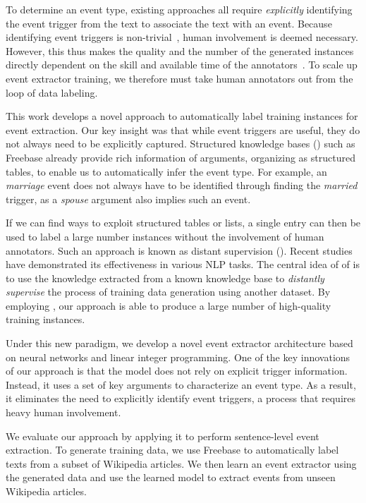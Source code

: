 To determine an event type, existing approaches  all require \emph{explicitly} identifying the event trigger from the text to associate the
text with an event. Because identifying event triggers is non-trivial~\FIXME{\cite{}}, human involvement is deemed necessary. However, this
thus makes the quality and the number of the generated instances directly dependent on the skill and available time of the
annotators~\cite{aguilar2014comparison,song2015light}. To scale up event extractor training, we therefore must take human annotators out
from the loop of data labeling.


This work develops a novel approach to automatically label training instances for event extraction. Our key insight was that while event
triggers are useful, they do not always need to be explicitly captured. Structured knowledge bases (\KBs) such as Freebase already provide
rich information of arguments, organizing as structured tables, to enable us to automatically infer the event type. For example, an
\emph{marriage} event does not always have to be identified through finding the \emph{married} trigger, as a \emph{spouse} argument also
implies
such an event. %


If we can find ways to exploit structured tables or lists, a single entry can then be used to label a large number instances without the
involvement of human annotators. Such an approach is known as distant supervision (\DS). Recent
studies~\cite{mintz2009distant,zeng2015distant} have demonstrated its effectiveness in various NLP tasks. The central idea of of \DS is to
use the knowledge extracted from a known knowledge base to \emph{distantly supervise} the process of training data generation using another
dataset. By employing \DS, our approach is able to produce a large number of high-quality training instances.

Under this new \DS paradigm, we develop a novel event extractor architecture based on neural networks and linear integer programming. One
of the key innovations of our approach is that the model does not rely on explicit trigger information. Instead, it uses a set of key
arguments to characterize an event type. As a result, it eliminates the need to explicitly identify event triggers, a process that requires
heavy human involvement.

We evaluate our approach by  applying it to perform sentence-level event extraction. To generate training data, we use Freebase to
automatically label texts from a subset of Wikipedia articles. We then learn an event extractor using the generated data and use the
learned model to extract events from unseen Wikipedia articles.

